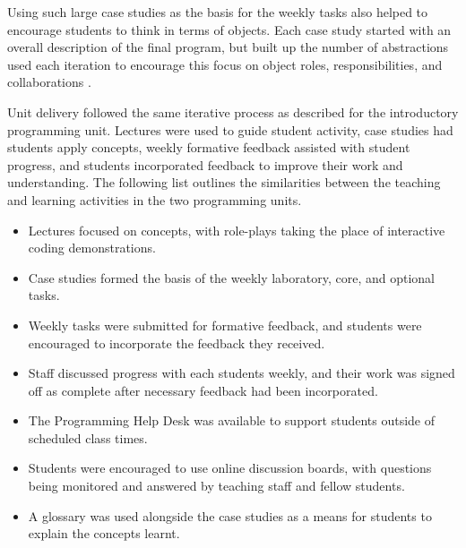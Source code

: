 Using such large case studies as the basis for the weekly tasks also helped to encourage students to think in terms of objects. Each case study started with an overall description of the final program, but built up the number of abstractions used each iteration to encourage this focus on object roles, responsibilities, and collaborations \cite{Wirfs:2003}.



Unit delivery followed the same iterative process as described for the introductory programming unit. Lectures were used to guide student activity, case studies had students apply concepts, weekly formative feedback assisted with student progress, and students incorporated feedback to improve their work and understanding. The following list outlines the similarities between the teaching and learning activities in the two programming units.

\begin{itemize}[noitemsep,nolistsep]
	\item Lectures focused on concepts, with role-plays taking the place of interactive coding demonstrations.
	\item Case studies formed the basis of the weekly laboratory, core, and optional tasks.

	\item Weekly tasks were submitted for formative feedback, and students were encouraged to incorporate the feedback they received.
	\item Staff discussed progress with each students weekly, and their work was signed off as complete after necessary feedback had been incorporated.
	\item The Programming Help Desk was available to support students outside of scheduled class times.
	\item Students were encouraged to use online discussion boards, with questions being monitored and answered by teaching staff and fellow students.
	\item A glossary was used alongside the case studies as a means for students to explain the concepts learnt.
\end{itemize}

